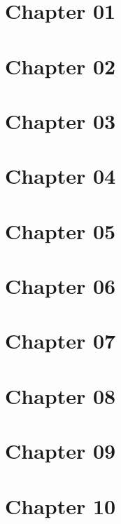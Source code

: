 \chapter{Chapter 01}


\chapter{Chapter 02}


\chapter{Chapter 03}


\chapter{Chapter 04}


\chapter{Chapter 05}


\chapter{Chapter 06}


\chapter{Chapter 07}


\chapter{Chapter 08}


\chapter{Chapter 09}


\chapter{Chapter 10}
